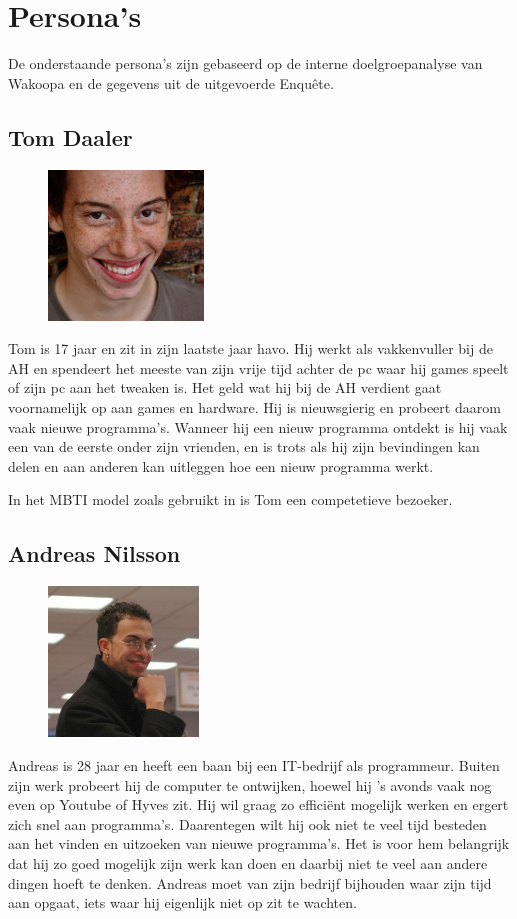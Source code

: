\chapter{Persona's}
    \label{personasappendix}
De onderstaande persona's zijn gebaseerd op de interne doelgroepanalyse van Wakoopa en de gegevens uit de uitgevoerde Enqu\^ete.

\section{Tom Daaler}
  \begin{figure}
      \includegraphics[height=40mm]{../images/personas/tom}
  \end{figure}
Tom is 17 jaar en zit in zijn laatste jaar havo. Hij werkt als vakkenvuller bij de AH en spendeert het meeste van zijn vrije tijd achter de pc waar hij games speelt of zijn pc aan het tweaken is. Het geld wat hij bij de AH verdient gaat voornamelijk op aan games en hardware. Hij is nieuwsgierig en probeert daarom vaak nieuwe programma's. Wanneer hij een nieuw programma ontdekt is hij vaak een van de eerste onder zijn vrienden, en is trots als hij zijn bevindingen kan delen en aan anderen kan uitleggen hoe een nieuw programma werkt.

In het MBTI model zoals gebruikt in \cite{Klompsma} is Tom een competetieve bezoeker.

\section{Andreas Nilsson}
  \begin{figure}
      \includegraphics[height=40mm]{../images/personas/andreas}
  \end{figure}
Andreas is 28 jaar en heeft een baan bij een IT-bedrijf als programmeur. Buiten zijn werk probeert hij de computer te ontwijken, hoewel hij 's avonds vaak nog even op Youtube of Hyves zit. Hij wil graag zo effici\"ent mogelijk werken en ergert zich snel aan programma's. Daarentegen wilt hij ook niet te veel tijd besteden aan het vinden en uitzoeken van nieuwe programma's. Het is voor hem belangrijk dat hij zo goed mogelijk zijn werk kan doen en daarbij niet te veel aan andere dingen hoeft te denken. Andreas moet van zijn bedrijf bijhouden waar zijn tijd aan opgaat, iets waar hij eigenlijk niet op zit te wachten.

